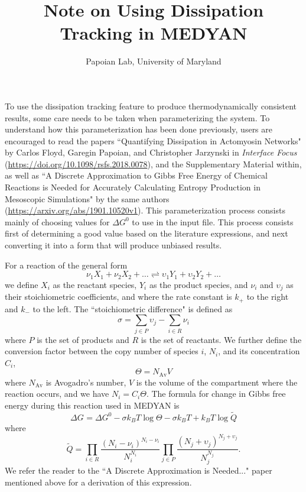 \documentclass[11pt, oneside]{article}   	%
\title{Note on Using Dissipation Tracking in MEDYAN}
\author{Papoian Lab, University of Maryland}
\date{}							%
\begin{document}
\maketitle

To use the dissipation tracking feature to produce thermodynamically consistent results, some care needs to be taken when parameterizing the system.  To understand how this parameterization has been done previously, users are encouraged to read the papers ``Quantifying Dissipation in Actomyosin Networks" by Carlos Floyd, Garegin Papoian, and Christopher Jarzynski in \textit{Interface Focus} (\url{https://doi.org/10.1098/rsfs.2018.0078}), and the Supplementary Material within, as well as ``A Discrete Approximation to Gibbs Free Energy of Chemical Reactions is Needed for Accurately Calculating Entropy Production in Mesoscopic Simulations" by the same authors (\url{https://arxiv.org/abs/1901.10520v1}).  This parameterization process consists mainly of choosing values for $\Delta G^0$ to use in the input file.  This process consists first of determining a good value based on the literature expressions, and next converting it into a form that will produce unbiased results.  


For a reaction of the general form 
\begin{equation}
\label{eq6}
\nu_1 X_1 + \nu_2 X_2 + \ldots \rightleftharpoons \upsilon_1 Y_1 + \upsilon_2 Y_2 + \ldots 
\end{equation}
we define $X_i$ as the reactant species, $Y_i$ as the product species, and $\nu_i$ and $\upsilon_j$ as their stoichiometric coefficients, and where the rate constant is $k_+$ to the right and $k_-$ to the left.  The ``stoichiometric difference" is defined as
\begin{equation}
\label{eq7}
\sigma = \sum_{j \in P} \upsilon_j - \sum_{i \in R} \nu_i 
\end{equation} 
where $P$ is the set of products and $R$ is the set of reactants.
We further define the conversion factor between the copy number of species $i$, $N_i$, and its concentration $C_i$,
\begin{equation}
\label{eq8}
\Theta = N_\text{Av} V
\end{equation}
where $N_\text{Av}$ is Avogadro's number, $V$ is the volume of the compartment where the reaction occurs, and we have $N_i = C_i \Theta$.  
The formula for change in Gibbs free energy during this reaction used in MEDYAN is
\begin{equation}
\Delta G_{} = \Delta G^0 - \sigma k_B T  \log{\Theta} - \sigma k_B T + k_B T \log{\widetilde{Q}} 
\label{eqa}
\end{equation}
where 
\begin{equation}
\widetilde{Q} = \prod_{i \in R} \frac{(N_i - \nu_i)^{N_i-\nu_i}}{N_i^{N_i}}  \prod_{j \in P} \frac{(N_j + \upsilon_j)^{N_j+\upsilon_j}}{N_j^{N_j}}.
\label{eqb}
\end{equation}
We refer the reader to the ``A Discrete Approximation is Needed..." paper mentioned above for a derivation of this expression.
\end{document}
